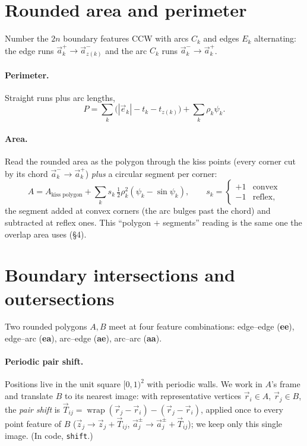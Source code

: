 \documentclass[11pt]{article}
\numberwithin{equation}{section}
\newcommand{\vv}[1]{\vec{#1}}
\newcommand{\half}{\tfrac{1}{2}}
\begin{document}
\section{Rounded area and perimeter}

Number the $2n$ boundary features CCW with arcs $C_k$ and edges $E_k$ alternating: the edge runs
$\vv a^{+}_k\to\vv a^{-}_{z(k)}$ and the arc $C_k$ runs $\vv a^{-}_k\to\vv a^{+}_k$.

\paragraph{Perimeter.} Straight runs plus arc lengths,
\begin{equation}
  P=\sum_k\big(|\vv e_k|-t_k-t_{z(k)}\big)+\sum_k\rho_k\psi_k.
\end{equation}

\paragraph{Area.} Read the rounded area as the polygon through the kiss points (every corner cut by
its chord $\vv a^{-}_k\to\vv a^{+}_k$) \emph{plus} a circular segment per corner:
\begin{equation}
  A=A_{\text{kiss polygon}}+\sum_k s_k\,\half\rho_k^2(\psi_k-\sin\psi_k),\qquad
  s_k=\begin{cases}+1&\text{convex}\\-1&\text{reflex},\end{cases}
\end{equation}
the segment added at convex corners (the arc bulges past the chord) and subtracted at reflex ones.
This ``polygon $+$ segments'' reading is the same one the overlap area uses (\S4).

\section{Boundary intersections and outersections}

Two rounded polygons $A,B$ meet at four feature combinations: edge--edge (\textbf{ee}), edge--arc
(\textbf{ea}), arc--edge (\textbf{ae}), arc--arc (\textbf{aa}).

\paragraph{Periodic pair shift.} Positions live in the unit square $[0,1)^2$ with periodic walls.
We work in $A$'s frame and translate $B$ to its nearest image: with representative vertices $\vv
r_i\in A$, $\vv r_j\in B$, the \emph{pair shift} is $\vv T_{ij}=\operatorname{wrap}(\vv r_j-\vv
r_i)-(\vv r_j-\vv r_i)$, applied once to every point feature of $B$ ($\vv z_j\to\vv z_j+\vv T_{ij}$,
$\vv a^{\pm}_j\to\vv a^{\pm}_j+\vv T_{ij}$); we keep only this single image. (In code, \texttt{shift}.)
\end{document}
